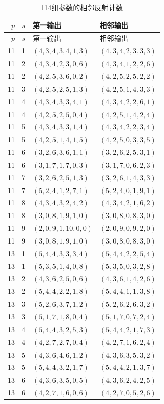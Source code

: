 \documentclass[11pt,a4paper,oneside,openany]{book}
\theoremstyle{definition}
\numberwithin{equation}{chapter}
\begin{document}
\begin{longtable}{rrll}
\caption{114组参数的相邻反射计数}\label{tab:root-data}\\
\toprule $p$&$s$&第一输出&相邻输出\\\midrule\endfirsthead
\toprule $p$&$s$&第一输出&相邻输出\\\midrule\endhead
11&1&$(4,3,4,3,4,1,3)$&$(4,3,4,2,3,3,3)$\\
11&2&$(4,3,4,2,3,0,6)$&$(4,3,4,1,2,2,6)$\\
11&2&$(4,2,5,3,6,0,2)$&$(4,2,5,2,5,2,2)$\\
11&3&$(4,2,5,2,5,1,3)$&$(4,2,5,1,4,3,3)$\\
11&4&$(4,3,4,3,3,4,1)$&$(4,3,4,2,2,6,1)$\\
11&4&$(4,2,5,2,5,0,4)$&$(4,2,5,1,4,2,4)$\\
11&5&$(4,3,4,3,3,1,4)$&$(4,3,4,2,2,3,4)$\\
11&5&$(4,2,5,1,4,1,5)$&$(4,2,5,0,3,3,5)$\\
11&6&$(3,2,6,3,6,1,1)$&$(3,2,6,2,5,3,1)$\\
11&6&$(3,1,7,1,7,0,3)$&$(3,1,7,0,6,2,3)$\\
11&7&$(3,2,6,2,5,1,3)$&$(3,2,6,1,4,3,3)$\\
11&7&$(5,2,4,1,2,7,1)$&$(5,2,4,0,1,9,1)$\\
11&8&$(4,3,4,3,2,4,2)$&$(4,3,4,2,1,6,2)$\\
11&8&$(3,0,8,1,9,1,0)$&$(3,0,8,0,8,3,0)$\\
11&9&$(2,0,9,1,10,0,0)$&$(2,0,9,0,9,2,0)$\\
11&9&$(3,0,8,1,9,1,0)$&$(3,0,8,0,8,3,0)$\\
13&1&$(5,4,4,3,3,3,4)$&$(5,4,4,2,2,5,4)$\\
13&1&$(5,3,5,1,4,0,8)$&$(5,3,5,0,3,2,8)$\\
13&2&$(4,3,6,2,5,0,6)$&$(4,3,6,1,4,2,6)$\\
13&2&$(5,4,4,2,2,1,8)$&$(5,4,4,1,1,3,8)$\\
13&3&$(5,2,6,3,7,1,2)$&$(5,2,6,2,6,3,2)$\\
13&3&$(5,1,7,1,8,0,4)$&$(5,1,7,0,7,2,4)$\\
13&4&$(5,4,4,3,2,5,3)$&$(5,4,4,2,1,7,3)$\\
13&4&$(4,2,7,2,7,0,4)$&$(4,2,7,1,6,2,4)$\\
13&5&$(4,3,6,4,6,1,2)$&$(4,3,6,3,5,3,2)$\\
13&5&$(5,4,4,3,2,1,7)$&$(5,4,4,2,1,3,7)$\\
13&6&$(4,3,6,3,5,0,5)$&$(4,3,6,2,4,2,5)$\\
13&6&$(4,2,7,1,6,0,6)$&$(4,2,7,0,5,2,6)$\\

\end{longtable}
\end{document}
